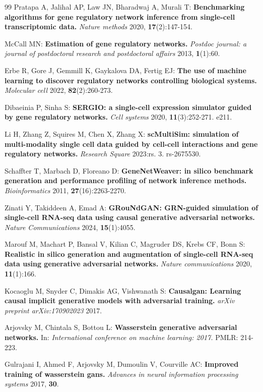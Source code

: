 \begin{tcolorbox}
\begin{singlespace}
\begin{thebibliography}{99\kern\bibindent}
Pratapa A, Jalihal AP, Law JN, Bharadwaj A, Murali T: \textbf{Benchmarking algorithms for gene regulatory network inference from single-cell transcriptomic data.} \textit{Nature methods} 2020, \textbf{17}(2):147-154.

McCall MN: \textbf{Estimation of gene regulatory networks.} \textit{Postdoc journal: a journal of postdoctoral research and postdoctoral affairs} 2013, \textbf{1}(1):60.

Erbe R, Gore J, Gemmill K, Gaykalova DA, Fertig EJ: \textbf{The use of machine learning to discover regulatory networks controlling biological systems.} \textit{Molecular cell} 2022, \textbf{82}(2):260-273.

Dibaeinia P, Sinha S: \textbf{SERGIO: a single-cell expression simulator guided by gene regulatory networks.} \textit{Cell systems} 2020, \textbf{11}(3):252-271. e211.

Li H, Zhang Z, Squires M, Chen X, Zhang X: \textbf{scMultiSim: simulation of multi-modality single cell data guided by cell-cell interactions and gene regulatory networks.} \textit{Research Square} 2023:rs. 3. rs-2675530.

Schaffter T, Marbach D, Floreano D: \textbf{GeneNetWeaver: in silico benchmark generation and performance profiling of network inference methods.} \textit{Bioinformatics} 2011, \textbf{27}(16):2263-2270.

Zinati Y, Takiddeen A, Emad A: \textbf{GRouNdGAN: GRN-guided simulation of single-cell RNA-seq data using causal generative adversarial networks.} \textit{Nature Communications} 2024, \textbf{15}(1):4055.

Marouf M, Machart P, Bansal V, Kilian C, Magruder DS, Krebs CF, Bonn S: \textbf{Realistic in silico generation and augmentation of single-cell RNA-seq data using generative adversarial networks.} \textit{Nature communications} 2020, \textbf{11}(1):166.

Kocaoglu M, Snyder C, Dimakis AG, Vishwanath S: \textbf{Causalgan: Learning causal implicit generative models with adversarial training.} \textit{arXiv preprint arXiv:170902023} 2017.

Arjovsky M, Chintala S, Bottou L: \textbf{Wasserstein generative adversarial networks.} In: \textit{International conference on machine learning: 2017.} PMLR: 214-223.

Gulrajani I, Ahmed F, Arjovsky M, Dumoulin V, Courville AC: \textbf{Improved training of wasserstein gans.} \textit{Advances in neural information processing systems} 2017, \textbf{30}.


\end{thebibliography}
\end{singlespace}
\end{tcolorbox}
